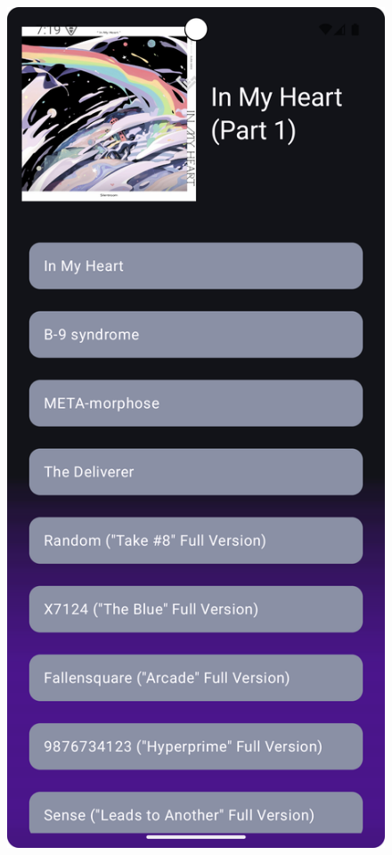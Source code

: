 \begin{figure}[H]
	\caption{}
	\label{fig:test_album_view}
\end{figure}

\begin{figure}[H]
	\centering
	\includegraphics[width=1\textwidth]{images/tutorial_song_view.png}
	\caption{}
	\label{fig:test_song_view}
\end{figure}

